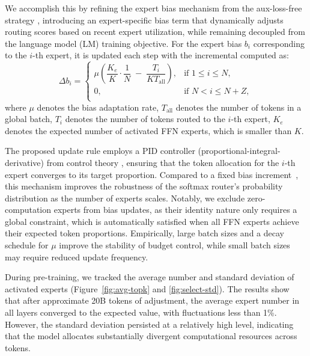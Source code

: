 \documentclass{article}
\begin{document}
We accomplish this by refining the expert bias mechanism from the aux-loss-free strategy \citep{wang2024auxiliary}, introducing an expert-specific bias term that dynamically adjusts routing scores based on recent expert utilization, while remaining decoupled from the language model (LM) training objective. 
For the expert bias $b_i$ corresponding to the $i$-th expert, it is updated each step with the incremental computed as:
\begin{equation}
\label{eq:bias}
    \Delta b_i =
    \begin{cases}
        \mu \left( \dfrac{K_{e}}{K} \cdot \dfrac{1}{N} \;-\; \dfrac{T_i}{KT_{\mathrm{all}}} \right), & \text{if } 1 \leq i \leq N, \\[1.2ex]
        0, & \text{if } N < i \leq N+Z,  \\
    \end{cases}
\end{equation}
where $\mu$ denotes the bias adaptation rate, $T_{\mathrm{all}}$ denotes the  number of tokens in a global batch, $T_i$ denotes the number of tokens routed to the $i$-th expert, $K_{e}$ denotes the expected number of activated FFN experts, which is smaller than $K$.


The proposed update rule employs a PID controller (proportional-integral-derivative) from control theory \citep{control_book}, ensuring that the token allocation for the $i$-th expert converges to its target proportion. Compared to a fixed bias increment~\citep{wang2024auxiliary}, this mechanism improves the robustness of the softmax router's probability distribution as the number of experts scales. Notably, we exclude zero-computation experts from bias updates, as their identity nature only requires a global constraint, which is automatically satisfied when all FFN experts achieve their expected token proportions. Empirically, large batch sizes and a decay schedule for $\mu$ improve the stability of budget control, while small batch sizes may require reduced update frequency.

During pre-training, we tracked the average number and standard deviation of activated experts (Figure~\ref{fig:avg-topk} and \ref{fig:select-std}). The results show that after approximate 20B tokens of adjustment, the average expert number in all layers converged to the expected value, with fluctuations less than 1\%.
However, the standard deviation persisted at a relatively high level, indicating that the model allocates substantially divergent computational resources across tokens.
\end{document}
